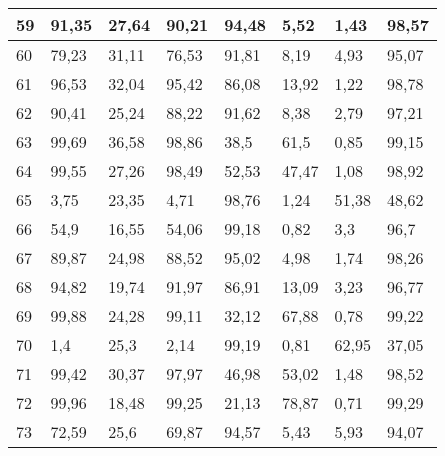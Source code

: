 \begin{longtable}[c]{|l|l|l|l|l|l|l|l|}
59              & 91,35        & 27,64        & 90,21       & 94,48         & 5,52          & 1,43          & 98,57         \\ \hline
60              & 79,23        & 31,11        & 76,53       & 91,81         & 8,19          & 4,93          & 95,07         \\ \hline
61              & 96,53        & 32,04        & 95,42       & 86,08         & 13,92         & 1,22          & 98,78         \\ \hline
62              & 90,41        & 25,24        & 88,22       & 91,62         & 8,38          & 2,79          & 97,21         \\ \hline
63              & 99,69        & 36,58        & 98,86       & 38,5          & 61,5          & 0,85          & 99,15         \\ \hline
64              & 99,55        & 27,26        & 98,49       & 52,53         & 47,47         & 1,08          & 98,92         \\ \hline
65              & 3,75         & 23,35        & 4,71        & 98,76         & 1,24          & 51,38         & 48,62         \\ \hline
66              & 54,9         & 16,55        & 54,06       & 99,18         & 0,82          & 3,3           & 96,7          \\ \hline
67              & 89,87        & 24,98        & 88,52       & 95,02         & 4,98          & 1,74          & 98,26         \\ \hline
68              & 94,82        & 19,74        & 91,97       & 86,91         & 13,09         & 3,23          & 96,77         \\ \hline
69              & 99,88        & 24,28        & 99,11       & 32,12         & 67,88         & 0,78          & 99,22         \\ \hline
70              & 1,4          & 25,3         & 2,14        & 99,19         & 0,81          & 62,95         & 37,05         \\ \hline
71              & 99,42        & 30,37        & 97,97       & 46,98         & 53,02         & 1,48          & 98,52         \\ \hline
72              & 99,96        & 18,48        & 99,25       & 21,13         & 78,87         & 0,71          & 99,29         \\ \hline
73              & 72,59        & 25,6         & 69,87       & 94,57         & 5,43          & 5,93          & 94,07         \\ \hline

\end{longtable}
